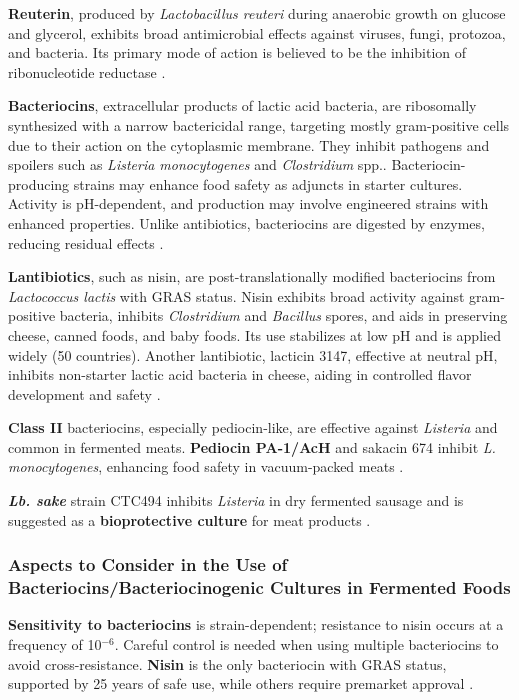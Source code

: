 \textbf{Reuterin}, produced by \textit{Lactobacillus reuteri} during anaerobic growth on glucose and glycerol, exhibits broad antimicrobial effects against viruses, fungi, protozoa, and bacteria. Its primary mode of action is believed to be the inhibition of ribonucleotide reductase \cite*{L8-MicroInFood}.

\textbf{Bacteriocins}, extracellular products of lactic acid bacteria, are ribosomally synthesized with a narrow bactericidal range, targeting mostly gram-positive cells due to their action on the cytoplasmic membrane. They inhibit pathogens and spoilers such as \textit{Listeria monocytogenes} and \textit{Clostridium} spp.. Bacteriocin-producing strains may enhance food safety as adjuncts in starter cultures. Activity is pH-dependent, and production may involve engineered strains with enhanced properties. Unlike antibiotics, bacteriocins are digested by enzymes, reducing residual effects \cite*{L8-MicroInFood}.

\textbf{Lantibiotics}, such as nisin, are post-translationally modified bacteriocins from \textit{Lactococcus lactis} with GRAS status. Nisin exhibits broad activity against gram-positive bacteria, inhibits \textit{Clostridium} and \textit{Bacillus} spores, and aids in preserving cheese, canned foods, and baby foods. Its use stabilizes at low pH and is applied widely (50 countries). Another lantibiotic, lacticin 3147, effective at neutral pH, inhibits non-starter lactic acid bacteria in cheese, aiding in controlled flavor development and safety \cite*{L8-MicroInFood}.


\textbf{Class II} bacteriocins, especially pediocin-like, are effective against \textit{Listeria} and common in fermented meats. \textbf{Pediocin PA-1/AcH} and sakacin 674 inhibit \textit{L. monocytogenes}, enhancing food safety in vacuum-packed meats \cite*{L8-MicroInFood}.

\textbf{\textit{Lb. sake}} strain CTC494 inhibits \textit{Listeria} in dry fermented sausage and is suggested as a \textbf{bioprotective culture} for meat products \cite*{L8-MicroInFood}.

\subsubsection*{Aspects to Consider in the Use of Bacteriocins/Bacteriocinogenic Cultures in Fermented Foods}
\textbf{Sensitivity to bacteriocins} is strain-dependent; resistance to nisin occurs at a frequency of 10$^{-6}$. Careful control is needed when using multiple bacteriocins to avoid cross-resistance. \textbf{Nisin} is the only bacteriocin with GRAS status, supported by 25 years of safe use, while others require premarket approval \cite*{L8-MicroInFood}.

